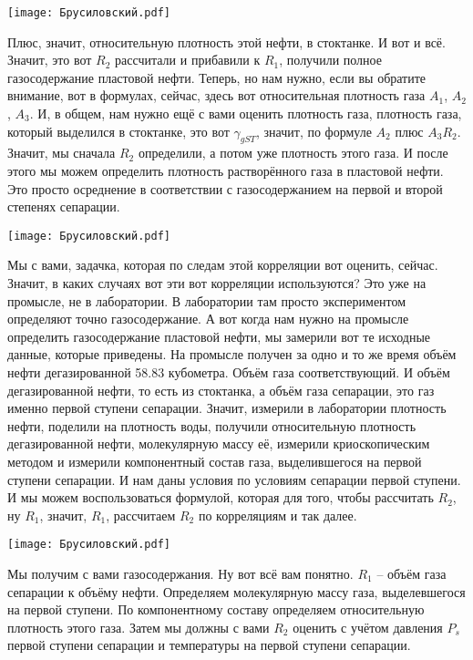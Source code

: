 \documentclass[main.tex]{subfiles}
\begin{document}
\begin{center}
\texttt{[image: Брусиловский.pdf]}
\end{center}

Плюс, значит, относительную плотность этой нефти, в стоктанке.
И вот и всё.
Значит, это вот $R_2$ рассчитали и прибавили к $R_1$, получили полное газосодержание пластовой нефти.
Теперь, но нам нужно, если вы обратите внимание, вот в формулах, сейчас, здесь вот относительная плотность газа $A_1$, $A_2$, $A_3$.
И, в общем, нам нужно ещё с вами оценить плотность газа, плотность газа, который выделился в стоктанке, это вот $\gamma_{gST}$, значит, по формуле $A_2$ плюс $A_3R_2$.
Значит, мы сначала $R_2$ определили, а потом уже плотность этого газа.
И после этого мы можем определить плотность растворённого газа в пластовой нефти.
Это просто осреднение в соответствии с газосодержанием на первой и второй степенях сепарации.

\begin{center}
\texttt{[image: Брусиловский.pdf]}
\end{center}

Мы с вами, задачка, которая по следам этой корреляции вот оценить, сейчас.
Значит, в каких случаях вот эти вот корреляции используются?
Это уже на промысле, не в лаборатории.
В лаборатории там просто экспериментом определяют точно газосодержание.
А вот когда нам нужно на промысле определить газосодержание пластовой нефти, мы замерили вот те исходные данные, которые приведены.
На промысле получен за одно и то же время объём нефти дегазированной 58.83 кубометра.
Объём газа соответствующий.
И объём дегазированной нефти, то есть из стоктанка, а объём газа сепарации, это газ именно первой ступени сепарации.
Значит, измерили в лаборатории плотность нефти, поделили на плотность воды, получили относительную плотность дегазированной нефти, молекулярную массу её, измерили криоскопическим методом и измерили компонентный состав газа, выделившегося на первой ступени сепарации.
И нам даны условия по условиям сепарации первой ступени.
И мы можем воспользоваться формулой, которая для того, чтобы рассчитать $R_2$, ну $R_1$, значит, $R_1$, рассчитаем $R_2$ по корреляциям и так далее.

\begin{center}
\texttt{[image: Брусиловский.pdf]}
\end{center}

Мы получим с вами газосодержания.
Ну вот всё вам понятно.
$R_1$ -- объём газа сепарации к объёму нефти.
Определяем молекулярную массу газа, выделевшегося на первой ступени.
По компонентному составу определяем относительную плотность этого газа.
Затем мы должны с вами $R_2$ оценить с учётом давления $P_s$ первой ступени сепарации и температуры на первой ступени сепарации.
\end{document}
